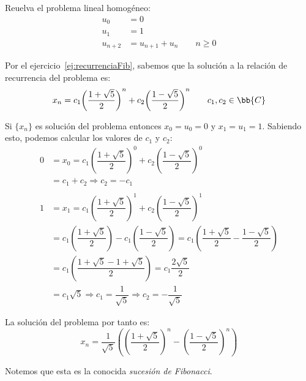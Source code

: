 \begin{ejercicio}
    Reuelva el problema lineal homogéneo:
    \begin{align*}
        u_0 &= 0\\    
        u_1 &= 1 \\
        u_{n+2} &= u_{n+1} + u_n \qquad n \geq 0
    \end{align*}

    Por el ejercicio~\ref{ej:recurrenciaFib}, sabemos que la solución a la relación de recurrencia del problema es:
    \begin{equation*}
        x_n = c_1{\left(\dfrac{1+\sqrt{5}}{2}\right)}^n + c_2 {\left(\dfrac{1-\sqrt{5}}{2}\right)}^n
        \qquad c_1,c_2\in \bb{C}
    \end{equation*}

    Si $\{x_n\}$ es solución del problema entonces $x_0 = u_0 = 0$ y $x_1 = u_1 = 1$. Sabiendo esto,
    podemos calcular los valores de $c_1$ y $c_2$:
    \begin{align*}
        0 &= x_0 = c_1{\left(\dfrac{1+\sqrt{5}}{2}\right)}^0 + c_2 {\left(\dfrac{1-\sqrt{5}}{2}\right)}^0\\
          &= c_1 + c_2 \Longrightarrow c_2 = -c_1\\\\
        1 &= x_1 = c_1 {\left(\dfrac{1+\sqrt{5}}{2}\right)}^1 + c_2 {\left(\dfrac{1-\sqrt{5}}{2}\right)}^1 \\
          &= c_1 \left(\dfrac{1+\sqrt{5}}{2}\right) - c_1 \left(\dfrac{1-\sqrt{5}}{2}\right) 
          = c_1 \left(\dfrac{1+\sqrt{5}}{2} - \dfrac{1-\sqrt{5}}{2}\right) \\
          &= c_1 \left(\dfrac{1+\sqrt{5}-1+\sqrt{5}}{2}\right) 
          = c_1 \dfrac{2\sqrt{5}}{2} \\
          &= c_1 \sqrt{5} \Longrightarrow c_1 = \dfrac{1}{\sqrt{5}} \Longrightarrow c_2 = -\dfrac{1}{\sqrt{5}}
    \end{align*}

    La solución del problema por tanto es:
    \begin{equation*}
    x_n = \dfrac{1}{\sqrt{5}}\left({\left(\dfrac{1+\sqrt{5}}{2}\right)}^n - {\left(\dfrac{1-\sqrt{5}}{2}\right)}^n\right)
    \end{equation*}

    Notemos que esta es la conocida \emph{sucesión de Fibonacci}.
\end{ejercicio}

